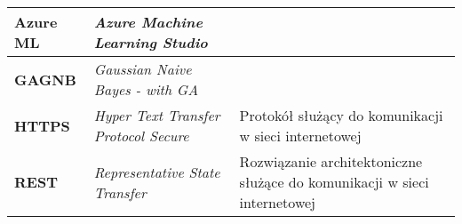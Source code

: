 \begin{table}[H]
\begin{tabularx}{\linewidth}{lXX}
        \textbf{Azure ML} & \textit{Azure Machine Learning Studio} & \\ \hline
        \textbf{GAGNB} & \textit{Gaussian Naive Bayes - with GA} & \\ \hline
        \textbf{HTTPS} & \textit{Hyper Text Transfer Protocol Secure} & Protokół służący do komunikacji w sieci internetowej \\ \hline
        \textbf{REST} & \textit{Representative State Transfer} & Rozwiązanie architektoniczne służące do komunikacji w sieci internetowej \\ \hline
    \end{tabularx}
    \label{tab:shorts}
\end{table}